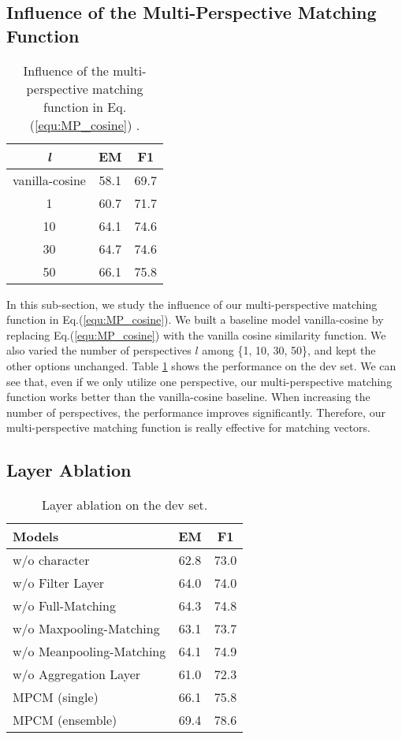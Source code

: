\documentclass[11pt,letterpaper]{article}
\begin{document}
\subsection{Influence of the Multi-Perspective Matching Function}
\begin{table}[tbp]
\centering
\begin{tabular}{ccc}
\toprule
\emph{l} & EM   & F1   \\
\midrule
vanilla-cosine        & 58.1 & 69.7 \\
1                         & 60.7 & 71.7 \\
10                        & 64.1 & 74.6 \\
30                        & 64.7 & 74.6 \\
50                        & 66.1 & 75.8 \\
\bottomrule
\end{tabular}
\caption{Influence of the multi-perspective matching function in Eq.(\ref{equ:MP_cosine}) .}
\label{tab:mp-matching}
\end{table}

In this sub-section, we study the influence of our multi-perspective matching function in Eq.(\ref{equ:MP_cosine}). We built a baseline model vanilla-cosine by replacing Eq.(\ref{equ:MP_cosine}) with the vanilla cosine similarity function. We also varied the number of perspectives $l$ among \{1, 10, 30, 50\}, and kept the other options unchanged. Table \ref{tab:mp-matching} shows the performance on the dev set. We can see that, even if we only utilize one perspective, our multi-perspective matching function works better than the vanilla-cosine baseline. When increasing the number of perspectives, the performance improves significantly. Therefore, our multi-perspective matching function is really effective for matching vectors. 


\subsection{Layer Ablation}
\begin{table}[tbp]
\centering
\begin{tabular}{lcc}
\toprule
Models                   & EM   & F1   \\
\midrule
w/o character       & 62.8 & 73.0 \\
w/o Filter Layer         & 64.0 & 74.0 \\
w/o Full-Matching       & 64.3 & 74.8 \\
w/o Maxpooling-Matching  & 63.1 & 73.7 \\
w/o Meanpooling-Matching & 64.1 & 74.9 \\
w/o Aggregation Layer    & 61.0 & 72.3 \\
\midrule
MPCM (single)            & 66.1 & 75.8 \\
MPCM (ensemble)          & 69.4 & 78.6 \\
\bottomrule
\end{tabular}
\caption{Layer ablation on the dev set.}
\label{tab:ablation}
\end{table}
\end{document}
